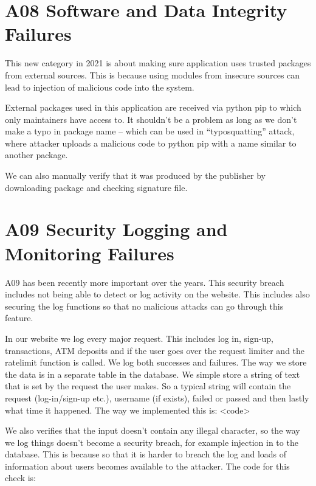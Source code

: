 \pagebreak
\section{A08 Software and Data Integrity Failures}

This new category in 2021 is about making sure application uses trusted packages from external sources. This is because using modules from insecure sources can lead to injection of malicious code into the system.

External packages used in this application are received via python pip to which only maintainers have access to. It shouldn’t be a problem as long as we don’t make a typo in package name – which can be used in “typosquatting” attack, where attacker uploads a malicious code to python pip with a name similar to another package.

We can also manually verify that it was produced by the publisher by downloading package and checking signature file.

\section{A09 Security Logging and Monitoring Failures}

A09 has been recently more important over the years. This security breach includes not being able to detect or log activity on the website. This includes also securing the log functions so that no malicious attacks can go through this feature. 

In our website we log every major request. This includes log in, sign-up, transactions, ATM deposits and if the user goes over the request limiter and the ratelimit function is called. We log both successes and failures. The way we store the data is in a separate table in the database. We simple store a string of text that is set by the request the user makes. So a typical string will contain the request (log-in/sign-up etc.), username (if exists), failed or passed and then lastly what time it happened. The way we implemented this is: <code>

We also verifies that the input doesn’t contain any illegal character, so the way we log things doesn’t become a security breach, for example injection in to the database. This is because so that it is harder to breach the log and loads of information about users becomes available to the attacker. The code for this check is: 

\pagebreak
{}

